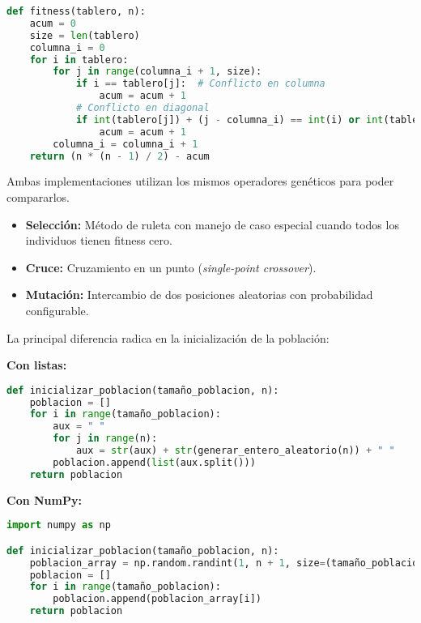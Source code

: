 \documentclass[journal]{IEEEtran}
\begin{document}
\begin{lstlisting}[language=Python, caption={Función de fitness para el problema de las $N$-Reinas}]
def fitness(tablero, n):
    acum = 0
    size = len(tablero)
    columna_i = 0
    for i in tablero:
        for j in range(columna_i + 1, size):
            if i == tablero[j]:  # Conflicto en columna
                acum = acum + 1
            # Conflicto en diagonal
            if int(tablero[j]) + (j - columna_i) == int(i) or int(tablero[j]) - (j - columna_i) == int(i):
                acum = acum + 1
        columna_i = columna_i + 1
    return (n * (n - 1) / 2) - acum
\end{lstlisting}

Ambas implementaciones utilizan los mismos operadores genéticos para poder compararlos.  
\begin{itemize}
    \item \textbf{Selección:} Método de ruleta con manejo de caso especial cuando todos los individuos tienen fitness cero.
    \item \textbf{Cruce:} Cruzamiento en un punto (\textit{single-point crossover}).
    \item \textbf{Mutación:} Intercambio de dos posiciones aleatorias con probabilidad configurable.
\end{itemize}

La principal diferencia radica en la inicialización de la población:

\textbf{Con listas:}

\begin{lstlisting}[language=Python, caption={Inicialización de la población usando listas}]
def inicializar_poblacion(tamaño_poblacion, n):
    poblacion = []
    for i in range(tamaño_poblacion):
        aux = " "
        for j in range(n):
            aux = str(aux) + str(generar_entero_aleatorio(n)) + " "
        poblacion.append(list(aux.split()))
    return poblacion
\end{lstlisting}

\textbf{Con NumPy:}

\begin{lstlisting}[language=Python, caption={Inicialización de la población usando NumPy}]
import numpy as np

def inicializar_poblacion(tamaño_poblacion, n):
    poblacion_array = np.random.randint(1, n + 1, size=(tamaño_poblacion, n), dtype=np.int8)
    poblacion = []
    for i in range(tamaño_poblacion):
        poblacion.append(poblacion_array[i])
    return poblacion
\end{lstlisting}
\end{document}
